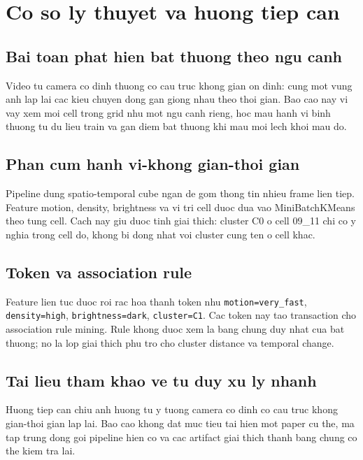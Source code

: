 \chapter{Co so ly thuyet va huong tiep can}

\section{Bai toan phat hien bat thuong theo ngu canh}

Video tu camera co dinh thuong co cau truc khong gian on dinh: cung mot vung anh lap lai cac kieu chuyen dong gan giong nhau theo thoi gian. Bao cao nay vi vay xem moi cell trong grid nhu mot ngu canh rieng, hoc mau hanh vi binh thuong tu du lieu train va gan diem bat thuong khi mau moi lech khoi mau do.

\section{Phan cum hanh vi-khong gian-thoi gian}

Pipeline dung spatio-temporal cube ngan de gom thong tin nhieu frame lien tiep. Feature motion, density, brightness va vi tri cell duoc dua vao MiniBatchKMeans theo tung cell. Cach nay giu duoc tinh giai thich: cluster C0 o cell 09\_11 chi co y nghia trong cell do, khong bi dong nhat voi cluster cung ten o cell khac.

\section{Token va association rule}

Feature lien tuc duoc roi rac hoa thanh token nhu \texttt{motion=very\_fast}, \texttt{density=high}, \texttt{brightness=dark}, \texttt{cluster=C1}. Cac token nay tao transaction cho association rule mining. Rule khong duoc xem la bang chung duy nhat cua bat thuong; no la lop giai thich phu tro cho cluster distance va temporal change.

\section{Tai lieu tham khao ve tu duy xu ly nhanh}

Huong tiep can chiu anh huong tu y tuong camera co dinh co cau truc khong gian-thoi gian lap lai. Bao cao khong dat muc tieu tai hien mot paper cu the, ma tap trung dong goi pipeline hien co va cac artifact giai thich thanh bang chung co the kiem tra lai.

